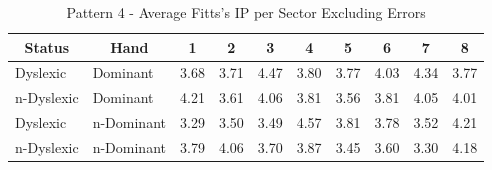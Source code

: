 	\begin{table}[h]
		\centering
		\caption{Pattern 4 - Average Fitts's IP per Sector Excluding Errors}
		\label{tab_pat_4_ip}
		\begin{tabularx}{\textwidth}{|l|l|X|X|X|X|X|X|X|X|}
			\hline
			\multicolumn{1}{|c|}{\textbf{Status}} & \multicolumn{1}{c|}{\textbf{Hand}} & \multicolumn{1}{c|}{\textbf{1}} & \multicolumn{1}{c|}{\textbf{2}} & \multicolumn{1}{c|}{\textbf{3}} & \multicolumn{1}{c|}{\textbf{4}} & \multicolumn{1}{c|}{\textbf{5}} & \multicolumn{1}{c|}{\textbf{6}} & \multicolumn{1}{c|}{\textbf{7}} & \multicolumn{1}{c|}{\textbf{8}} \\ \hline
			Dyslexic                              & Dominant                           & 3.68                            & 3.71                            & 4.47                            & 3.80                            & 3.77                            & 4.03                            & 4.34                            & 3.77                            \\ \hline
			n-Dyslexic                          & Dominant                           & 4.21                            & 3.61                            & 4.06                            & 3.81                            & 3.56                            & 3.81                            & 4.05                            & 4.01                            \\ \hline
			Dyslexic                              & n-Dominant                       & 3.29                            & 3.50                            & 3.49                            & 4.57                            & 3.81                            & 3.78                            & 3.52                            & 4.21                            \\ \hline
			n-Dyslexic                          & n-Dominant                       & 3.79                            & 4.06                            & 3.70                            & 3.87                            & 3.45                            & 3.60                            & 3.30                            & 4.18                            \\ \hline
		\end{tabularx}
	\end{table}		

